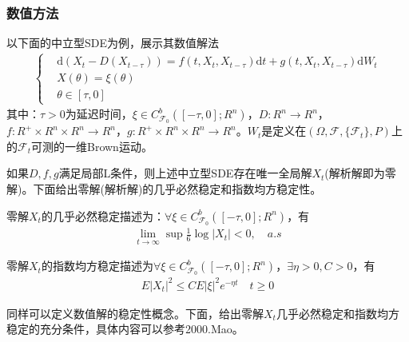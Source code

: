         \subsubsection{数值方法}
            \par
            以下面的中立型SDE为例，展示其数值解法
            \begin{align*}
                \left\{
                    \begin{aligned}
                    &\mathrm{d}(X_t - D(X_{t-\tau})) = f(t,X_t,X_{t-\tau})\mathrm{d}t + g(t,X_t,X_{t-\tau})\mathrm{d}W_t\\
                    &X(\theta) = \xi(\theta)\\
                    &\theta \in [\tau,0]
                    \end{aligned}
                \right.
            \end{align*}
            其中：$\tau>0$为延迟时间，$\xi \in C_{\mathcal{F}_0}^b([-\tau,0];R^n)$，$D:R^n\rightarrow R^n$，$f:R^+\times R^n \times R^n \rightarrow R^n$，$g:R^+\times R^n \times R^n \rightarrow R^n$。$W_t$是定义在$(\Omega,\mathcal{F},\{\mathcal{F}_t\},P)$上的$\mathcal{F}_t$可测的一维Brown运动。
            \par
            如果$D,f,g$满足局部L条件，则上述中立型SDE存在唯一全局解$X_t$(解析解即为零解)。下面给出零解(解析解)的几乎必然稳定和指数均方稳定性。
            \begin{theorem}[解析解的几乎必然稳定]
                零解$X_t$的几乎必然稳定描述为：$\forall \xi \in C_{\mathcal{F}_0}^b([-\tau,0];R^n)$，有
                \begin{align*}
                    \lim_{t\rightarrow \infty}\sup \frac{1}{6}\log |X_t| <0 ,\quad a.s
                \end{align*}
            \end{theorem}
            \begin{theorem}[解析解的指数均方稳定]
                零解$X_t$的指数均方稳定描述为$\forall \xi \in C_{\mathcal{F}_0}^b([-\tau,0];R^n)$，$\exists \eta >0,C>0$，有
                \begin{align*}
                    E|X_t|^2 \leqslant CE|\xi|^2 e^{-\eta t}\quad t \geqslant 0
                \end{align*}
            \end{theorem}
            \par
            同样可以定义数值解的稳定性概念。下面，给出零解$X_t$几乎必然稳定和指数均方稳定的充分条件，具体内容可以参考2000.Mao\cite{2000.Mao}。
